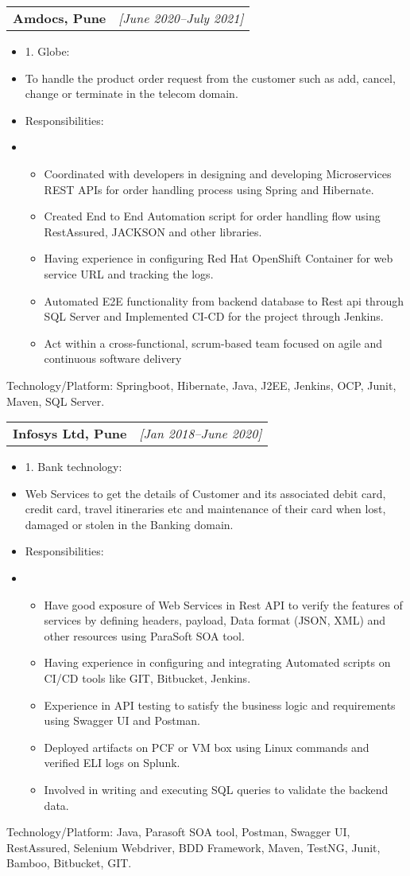 \documentclass[a4paper,10pt]{article}
\makeatletter
\newcommand{\resitem}[1]{\item #1}
\newcommand{\ressubheading}[3]{\begin{tabular*}{6.62in}{l @{\extracolsep{\fill}} r} \textbf{#1} & \textit{[#2]} \\ \end{tabular*}\vspace{-8pt}}
\makeatother
\begin{document}
\vspace{0.5em}

\ressubheading{Amdocs, Pune}{June 2020–July 2021}{Software Engineer}
\begin{itemize}[nosep]
    \resitem{1. Globe:}
    \resitem{To handle the product order request from the customer such as add, cancel, change or terminate in the telecom domain.}
    \resitem{Responsibilities:}
    \resitem{\begin{itemize}
        \item Coordinated with developers in designing and developing Microservices REST APIs for order handling process using Spring and Hibernate.
        \item Created End to End Automation script for order handling flow using RestAssured, JACKSON and other libraries.
        \item Having experience in configuring Red Hat OpenShift Container for web service URL and tracking the logs.
        \item Automated E2E functionality from backend database to Rest api through SQL Server and Implemented CI-CD for the project through Jenkins.
        \item Act within a cross-functional, scrum-based team focused on agile and continuous software delivery
    \end{itemize}}
\end{itemize}
Technology/Platform: Springboot, Hibernate, Java, J2EE, Jenkins, OCP, Junit, Maven, SQL Server.

\vspace{0.5em}

\ressubheading{Infosys Ltd, Pune}{Jan 2018–June 2020}{System Engineer}
\begin{itemize}[nosep]
    \resitem{1. Bank technology:}
    \resitem{Web Services to get the details of Customer and its associated debit card, credit card, travel itineraries etc and maintenance of their card when lost, damaged or stolen in the Banking domain.}
    \resitem{Responsibilities:}
    \resitem{\begin{itemize}
        \item Have good exposure of Web Services in Rest API to verify the features of services by defining headers, payload, Data format (JSON, XML) and other resources using ParaSoft SOA tool.
        \item Having experience in configuring and integrating Automated scripts on CI/CD tools like GIT, Bitbucket, Jenkins.
        \item Experience in API testing to satisfy the business logic and requirements using Swagger UI and Postman.
        \item Deployed artifacts on PCF or VM box using Linux commands and verified ELI logs on Splunk.
        \item Involved in writing and executing SQL queries to validate the backend data.
    \end{itemize}}
\end{itemize}
Technology/Platform: Java, Parasoft SOA tool, Postman, Swagger UI, RestAssured, Selenium Webdriver, BDD Framework, Maven, TestNG, Junit, Bamboo, Bitbucket, GIT.
\end{document}
